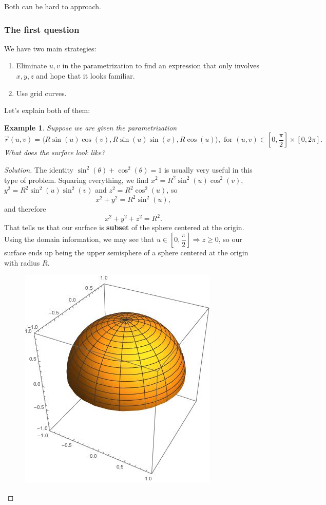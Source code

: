 \documentclass[12pt]{article}
\newcommand{\vr}{\vec{r}{}}
\renewcommand{\lg}{\langle}
\newcommand{\rg}{\rangle}
\let\implies\Rightarrow
\newenvironment{solution}
  {\begin{proof}[Solution]}
  {\end{proof}
  
  }
\newtheorem{example}{Example}
\begin{document}
Both can be hard to approach. 

\subsubsection*{The first question}
We have two main strategies:
\begin{enumerate}
\item Eliminate $u,v$ in the parametrization to find an expression that only involves $x, y, z$ and hope that it looks familiar.
\item Use grid curves.
\end{enumerate}

Let's explain both of them:

\begin{example} Suppose we are given the parametrization $$\vr(u,v)=\lg R\sin(u)\cos(v),R\sin(u)\sin(v),R\cos(u)\rg,\text{ for }(u,v)\in[0,\dfrac{\pi}{2}]\times[0,2\pi].$$ What does the surface look like?
\end{example}
\begin{solution} The identity $\sin^2(\theta)+\cos^2(\theta)=1$ is usually very useful in this type of problem. Squaring everything, we find $x^2=R^2\sin^2(u)\cos^2(v)$, $y^2=R^2\sin^2(u)\sin^2(v)$ and $z^2=R^2\cos^2(u)$, so $$x^2+y^2=R^2\sin^2(u),$$ and therefore $$x^2+y^2+z^2=R^2.$$ That tells us that our surface is \textbf{subset} of the sphere centered at the origin. Using the domain information, we may see that $u\in [0,\dfrac{\pi}{2}]\implies z\geq 0$, so our surface ends up being the upper semisphere of a sphere centered at the origin with radius $R$.
\begin{figure}[h]
\begin{center}
\includegraphics[scale=.3]{upperhalf.jpeg}
\end{center}
\end{figure}
\end{solution}
\end{document}
